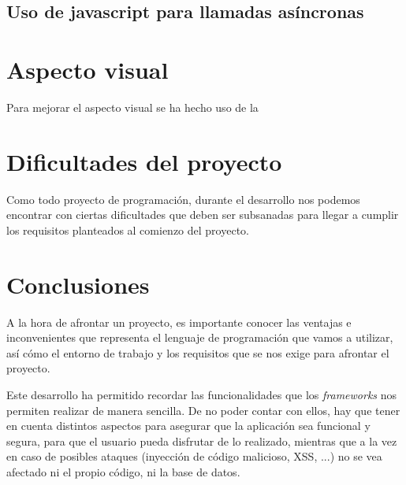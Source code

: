 \documentclass{\ClassPath/viu-tfm-template}
\begin{document}
\section{Uso de javascript para llamadas asíncronas}



\chapter{Aspecto visual}
Para mejorar el aspecto visual se ha hecho uso de la




\chapter{Dificultades del proyecto}

Como todo proyecto de programación, durante el desarrollo nos podemos encontrar con ciertas dificultades que deben ser subsanadas para llegar a cumplir los requisitos planteados al comienzo del proyecto.



\chapter{Conclusiones}

A la hora de afrontar un proyecto, es importante conocer las ventajas e inconvenientes que representa el lenguaje de programación que vamos a utilizar, así cómo el entorno de trabajo y los requisitos que se nos exige para afrontar el proyecto.

Este desarrollo ha permitido recordar las funcionalidades que los \textit{frameworks} nos permiten realizar de manera sencilla. De no poder contar con ellos, hay que tener en cuenta distintos aspectos para asegurar que la aplicación sea funcional y segura, para que el usuario pueda disfrutar de lo realizado, mientras que a la vez en caso de posibles ataques (inyección de código malicioso, XSS, ...) no se vea afectado ni el propio código, ni la base de datos.


\end{document}
